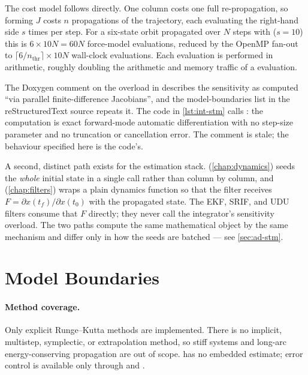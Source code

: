 The cost model follows directly. One column costs one full re-propagation, so
forming $J$ costs $n$ propagations of the trajectory, each evaluating the
right-hand side $s$ times per step. For a six-state orbit propagated over $N$
steps with  ($s = 10$) this is $6 \times 10 N = 60N$ force-model
evaluations, reduced by the OpenMP fan-out to $\lceil 6/n_{\mathrm{thr}}\rceil
\times 10N$ wall-clock evaluations. Each evaluation is performed in 
arithmetic, roughly doubling the arithmetic and memory traffic of a
 evaluation.

\begin{lupntnote}
  The Doxygen comment on the  overload in
   describes the sensitivity as computed
  ``via parallel finite-difference Jacobians'', and the model-boundaries list
  in the reStructuredText source repeats it. The code in \cref{lst:int-stm}
  calls : the computation is exact forward-mode
  automatic differentiation with no step-size parameter and no truncation or
  cancellation error. The comment is stale; the behaviour specified here is
  the code's.
\end{lupntnote}

A second, distinct path exists for the estimation stack.
 (\cref{chap:dynamics}) seeds the
\emph{whole} initial state in a single  call rather than column
by column, and  (\cref{chap:filters}) wraps a
plain dynamics function so that the filter receives
$F = \partial x(t_f)/\partial x(t_0)$ with the propagated state. The EKF, SRIF,
and UDU filters consume that $F$ directly; they never call the integrator's
sensitivity overload. The two paths compute the same mathematical object by
the same mechanism and differ only in how the seeds are batched --- see
\cref{sec:ad-stm}.

\section{Model Boundaries}
\label{sec:int-boundaries}

\paragraph{Method coverage.}
Only explicit Runge--Kutta methods are implemented. There is no implicit,
multistep, symplectic, or extrapolation method, so stiff systems and
long-arc energy-conserving propagation are out of scope.  has no
embedded estimate; error control is available only through  and
.

